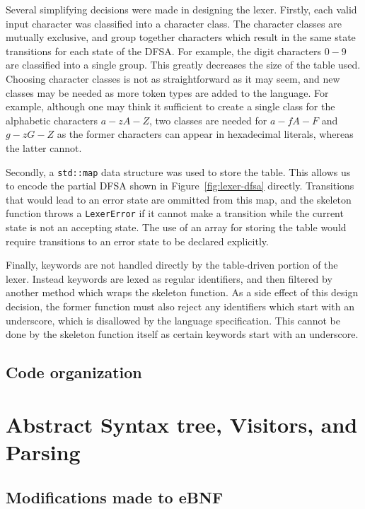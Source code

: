\documentclass[11pt,a4paper]{scrartcl}
\begin{document}
Several simplifying decisions were made in designing the lexer. Firstly, each valid input character was classified into a character class. The character classes are mutually exclusive, and group together characters which result in the same state transitions for each state of the DFSA. For example, the digit characters $0-9$ are classified into a single group. This greatly decreases the size of the table used. Choosing character classes is not as straightforward as it may seem, and new classes may be needed as more token types are added to the language. For example, although one may think it sufficient to create a single class for the alphabetic characters $a-zA-Z$, two classes are needed for $a-fA-F$ and $g-zG-Z$ as the former characters can appear in hexadecimal literals, whereas the latter cannot.

Secondly, a \verb!std::map! data structure was used to store the table. This allows us to encode the partial DFSA shown in Figure~\ref{fig:lexer-dfsa} directly. Transitions that would lead to an error state are ommitted from this map, and the skeleton function throws a \verb!LexerError! if it cannot make a transition while the current state is not an accepting state. The use of an array for storing the table would require transitions to an error state to be declared explicitly.

Finally, keywords are not handled directly by the table-driven portion of the lexer. Instead keywords are lexed as regular identifiers, and then filtered by another method which wraps the skeleton function. As a side effect of this design decision, the former function must also reject any identifiers which start with an underscore, which is disallowed by the language specification. This cannot be done by the skeleton function itself as certain keywords start with an underscore.

\subsection{Code organization}

\newpage

\section{Abstract Syntax tree, Visitors, and Parsing}

\subsection{Modifications made to eBNF}
\end{document}
